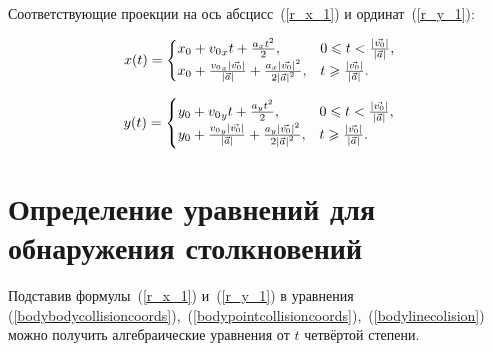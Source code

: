 Соответствующие проекции на ось абсцисс~(\ref{r_x_1}) и ординат~(\ref{r_y_1}):

\begin{equation}\label{r_x_1}
  x(t) =
  \begin{cases}
    x_0 + {v_0}_x t + \frac{a_x t^2}{2},                                                                                               & 0 \leqslant t < \frac{\left|\vec{v_0}\right|}{\left|\vec{a}\right|}, \\
    x_0 + \frac{{v_0}_x \left|\vec{v_0}\right|}{\left|\vec{a}\right|} + \frac{a_x \left|\vec{v_0}\right|^2}{2 \left|\vec{a}\right|^2}, & t \geqslant \frac{\left|\vec{v_0}\right|}{\left|\vec{a}\right|}.
  \end{cases}
\end{equation}

\begin{Underequation}
  \TODO
\end{Underequation}

\begin{equation}\label{r_y_1}
  y(t) =
  \begin{cases}
    y_0 + {v_0}_y t + \frac{a_y t^2}{2},                                                                                               & 0 \leqslant t < \frac{\left|\vec{v_0}\right|}{\left|\vec{a}\right|}, \\
    y_0 + \frac{{v_0}_y \left|\vec{v_0}\right|}{\left|\vec{a}\right|} + \frac{a_y \left|\vec{v_0}\right|^2}{2 \left|\vec{a}\right|^2}, & t \geqslant \frac{\left|\vec{v_0}\right|}{\left|\vec{a}\right|}.
  \end{cases}
\end{equation}

\begin{Underequation}
  \TODO
\end{Underequation}


\section{Определение уравнений для обнаружения столкновений}

Подставив формулы~(\ref{r_x_1}) и~(\ref{r_y_1}) в уравнения
(\ref{bodybodycollisioncoords}),~(\ref{bodypointcollisioncoords}),~(\ref{bodylinecolision})
можно получить алгебраические уравнения от \(t\) четвёртой степени.

